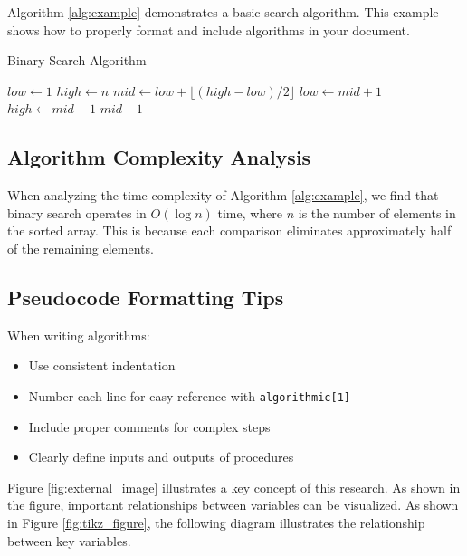 \documentclass[12pt,a4paper]{report}
\begin{document}
\begin{spacing}{1.5}
    Algorithm \ref{alg:example} demonstrates a basic search algorithm. This example shows how to properly format and include algorithms in your document.

    \begin{algorithm}
        \caption{Binary Search Algorithm}
        \label{alg:example}
        \begin{algorithmic}[1]
            \State $low \gets 1$
            \State $high \gets n$
            \State $mid \gets low + \lfloor (high - low) / 2 \rfloor$ 
            \State $low \gets mid + 1$
            \State $high \gets mid - 1$
            \Else
            \State \Return $mid$
            \EndIf
            \EndWhile
            \State \Return $-1$
            \EndProcedure
        \end{algorithmic}
    \end{algorithm}

    \subsection{Algorithm Complexity Analysis}
    When analyzing the time complexity of Algorithm \ref{alg:example}, we find that binary search operates in $O(\log n)$ time, where $n$ is the number of elements in the sorted array. This is because each comparison eliminates approximately half of the remaining elements.

    \subsection{Pseudocode Formatting Tips}
    When writing algorithms:
    \begin{itemize}
        \item Use consistent indentation
        \item Number each line for easy reference with \texttt{algorithmic[1]}
        \item Include proper comments for complex steps
        \item Clearly define inputs and outputs of procedures
    \end{itemize}

    Figure \ref{fig:external_image} illustrates a key concept of this research. As shown in the figure, important relationships between variables can be visualized.
    As shown in Figure \ref{fig:tikz_figure}, the following diagram illustrates the relationship between key variables.


\end{spacing}
\end{document}
